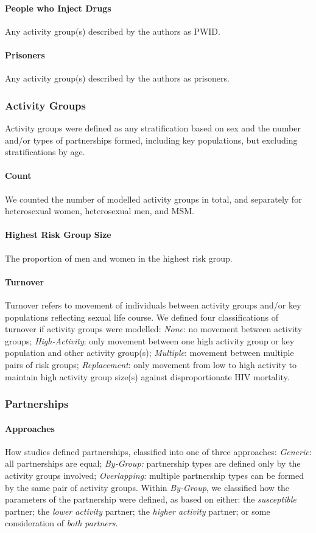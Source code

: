 \paragraph{People who Inject Drugs}
Any activity group(s) described by the authors as PWID.
\paragraph{Prisoners}
Any activity group(s) described by the authors as prisoners.
\subsubsection{Activity Groups}
\label{aaa:defs:act}
Activity groups were defined as any stratification based on
sex and the number and/or types of partnerships formed, including key populations,
but excluding stratifications by age.
\paragraph{Count}
We counted the number of modelled activity groups in total,
and separately for heterosexual women, heterosexual men, and MSM.
\paragraph{Highest Risk Group Size}
The proportion of men and women in the highest risk group.
\paragraph{Turnover}
Turnover refers to movement of individuals between
activity groups and/or key populations reflecting sexual life course.
We defined four classifications of turnover if activity groups were modelled:
\emph{None}: no movement between activity groups;
\emph{High-Activity}: only movement between one high activity group or key population
and other activity group(s);
\emph{Multiple}: movement between multiple pairs of risk groups;
\emph{Replacement}: only movement from low to high activity
to maintain high activity group size(s) against disproportionate HIV mortality.
\subsubsection{Partnerships}
\label{aaa:defs:pt}
\paragraph{Approaches}
How studies defined partnerships, classified into one of three approaches:
\emph{Generic}: all partnerships are equal;
\emph{By-Group:} partnership types are defined only by the activity groups involved;
\emph{Overlapping:} multiple partnership types can be formed by the same pair of activity groups.
Within \emph{By-Group}, we classified how the parameters of the partnership were defined, as based on either:
the \emph{susceptible} partner;
the \emph{lower activity} partner;
the \emph{higher activity} partner; or
some consideration of \emph{both partners}.
